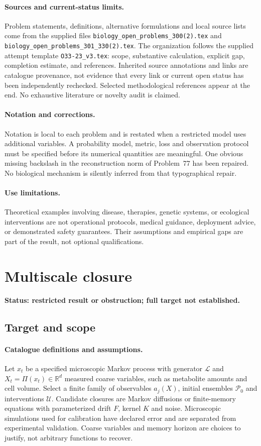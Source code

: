 \documentclass[11pt]{article}
\begin{document}
\paragraph{Sources and current-status limits.}
Problem statements, definitions, alternative formulations and local source lists
come from the supplied files
\texttt{biology\_open\_problems\_300(2).tex} and
\texttt{biology\_open\_problems\_301\_330(2).tex}.
The organization follows the supplied attempt template
\texttt{O33-23\_v3.tex}: scope, substantive calculation, explicit gap,
completion estimate, and references. Inherited source annotations and links are
catalogue provenance, not evidence that every link or current open status has
been independently rechecked. Selected methodological references appear at the
end. No exhaustive literature or novelty audit is claimed.

\paragraph{Notation and corrections.}
Notation is local to each problem and is restated when a restricted model uses
additional variables. A probability model, metric, loss and observation protocol
must be specified before its numerical quantities are meaningful. One obvious
missing backslash in the reconstruction norm of Problem~77 has been repaired.
No biological mechanism is silently inferred from that typographical repair.

\paragraph{Use limitations.}
Theoretical examples involving disease, therapies, genetic systems, or ecological
interventions are not operational protocols, medical guidance, deployment advice,
or demonstrated safety guarantees. Their assumptions and empirical gaps are part
of the result, not optional qualifications.


\section*{Multiscale closure}
\label{prob:042}
\noindent\textbf{Status: restricted result or obstruction; full target not established.}
\subsection{Target and scope}
\paragraph{Catalogue definitions and assumptions.}
Let $x_t$ be a specified microscopic Markov process with generator $\mathcal L$ and $X_t=\Pi(x_t)\in\mathbb{R}^d$ measured coarse variables, such as metabolite amounts and cell volume. Select a finite family of observables $a_j(X)$, initial ensembles $\mathcal P_0$ and interventions $\mathcal U$. Candidate closures are Markov diffusions or finite-memory equations with parameterized drift $F$, kernel $K$ and noise. Microscopic simulations used for calibration have declared error and are separated from experimental validation. Coarse variables and memory horizon are choices to justify, not arbitrary functions to recover.
\end{document}
